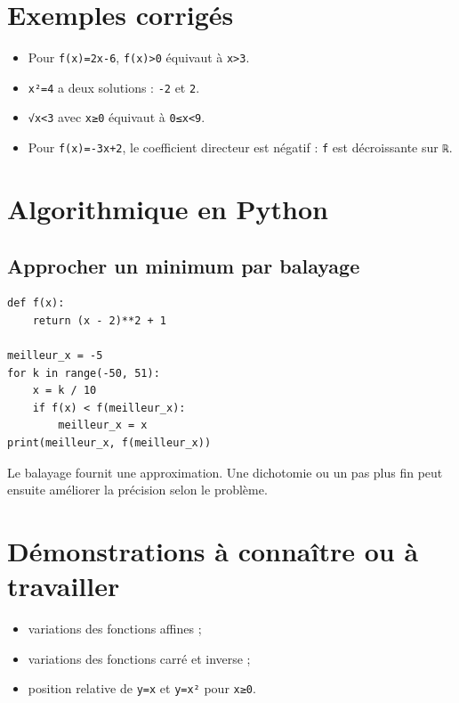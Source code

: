 \section{Exemples corrigés}

\begin{itemize}
\item Pour \texttt{f(x)=2x-6}, \texttt{f(x)>0} équivaut à \texttt{x>3}.
\item \texttt{x²=4} a deux solutions : \texttt{-2} et \texttt{2}.
\item \texttt{√x<3} avec \texttt{x≥0} équivaut à \texttt{0≤x<9}.
\item Pour \texttt{f(x)=-3x+2}, le coefficient directeur est négatif : \texttt{f} est décroissante sur \texttt{ℝ}.
\end{itemize}


\section{Algorithmique en Python}

\subsection{Approcher un minimum par balayage}

\begin{verbatim}
def f(x):
    return (x - 2)**2 + 1

meilleur_x = -5
for k in range(-50, 51):
    x = k / 10
    if f(x) < f(meilleur_x):
        meilleur_x = x
print(meilleur_x, f(meilleur_x))
\end{verbatim}

Le balayage fournit une approximation. Une dichotomie ou un pas plus fin peut ensuite améliorer la précision selon le problème.

\section{Démonstrations à connaître ou à travailler}

\begin{itemize}
\item variations des fonctions affines ;
\item variations des fonctions carré et inverse ;
\item position relative de \texttt{y=x} et \texttt{y=x²} pour \texttt{x≥0}.
\end{itemize}

